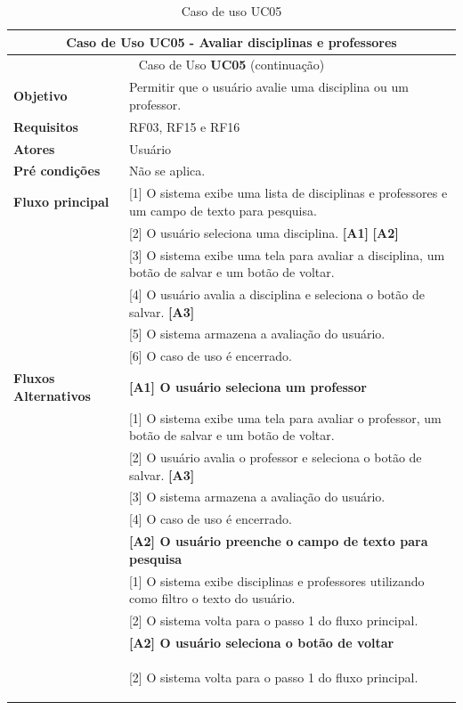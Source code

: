 \begin{longtable}{ | m{} | m{} | }
    \hline\hline
    \multicolumn{2}{|c|}{Caso de Uso \textbf{UC05} - Avaliar disciplinas e professores}\tabularnewline\hline\hline\endfirsthead
    \hline\hline
    \multicolumn{2}{|c|}{Caso de Uso \textbf{UC05} (continuação)}\tabularnewline\hline\hline\endhead
    \hline\endfoot
    \hline\caption{Caso de uso UC05}\endlastfoot

    \textbf{Objetivo} & Permitir que o usuário avalie uma disciplina ou um professor.\tabularnewline\hline
    \textbf{Requisitos} & RF03, RF15 e RF16\tabularnewline\hline
    \textbf{Atores} & Usuário\tabularnewline\hline
    \textbf{Pré condições} & Não se aplica.\tabularnewline\hline

    \multirow{1}{*}{\textbf{Fluxo principal}} & [1] O sistema exibe uma lista de disciplinas e professores e um campo de texto para pesquisa.\tabularnewline\cline{2-2}
    & [2] O usuário seleciona uma disciplina. \textbf{[A1]} \textbf{[A2]}\tabularnewline\cline{2-2}
    & [3] O sistema exibe uma tela para avaliar a disciplina, um botão de salvar e um botão de voltar.\tabularnewline\cline{2-2}
    & [4] O usuário avalia a disciplina e seleciona o botão de salvar. \textbf{[A3]}\tabularnewline\cline{2-2}
    & [5] O sistema armazena a avaliação do usuário.\tabularnewline\cline{2-2}
    & [6] O caso de uso é encerrado.\tabularnewline\hline

    \multirow{1}{*}{\textbf{Fluxos Alternativos}} & \textbf{[A1] O usuário seleciona um professor}\tabularnewline\cline{2-2}
    & [1] O sistema exibe uma tela para avaliar o professor, um botão de salvar e um botão de voltar.\tabularnewline\cline{2-2}
    & [2] O usuário avalia o professor e seleciona o botão de salvar. \textbf{[A3]}\tabularnewline\cline{2-2} 
    & [3] O sistema armazena a avaliação do usuário.\tabularnewline\cline{2-2}
    & [4] O caso de uso é encerrado.\tabularnewline\cline{2-2}

    & \textbf{[A2] O usuário preenche o campo de texto para pesquisa}\tabularnewline\cline{2-2}
    & [1] O sistema exibe disciplinas e professores utilizando como filtro o texto do usuário.\tabularnewline\cline{2-2}
    & [2] O sistema volta para o passo 1 do fluxo principal.\tabularnewline\cline{2-2}

    & \textbf{[A2] O usuário seleciona o botão de voltar}\tabularnewline\cline{2-2}
    & [2] O sistema volta para o passo 1 do fluxo principal. %

    \label{tab:uc05}
\end{longtable}

